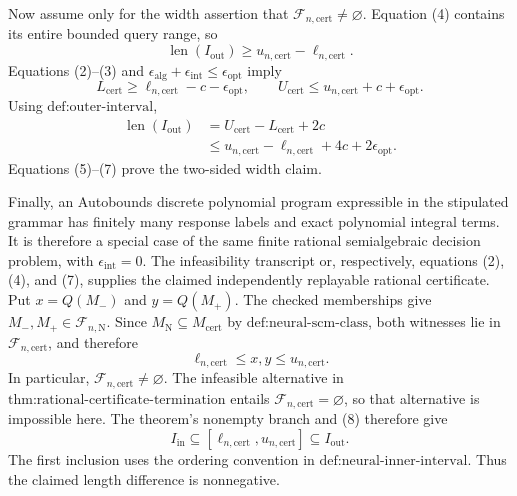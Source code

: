 Now assume only for the width assertion that \(\mathcal F_{n,\mathrm{cert}}\ne\varnothing\).  Equation (4) contains its entire bounded query range, so
\[
\operatorname{len}(I_{\mathrm{out}})\geq
u_{n,\mathrm{cert}}-\ell_{n,\mathrm{cert}}. \tag{5}
\]
Equations (2)--(3) and \(\epsilon_{\mathrm{alg}}+\epsilon_{\mathrm{int}}\leq\epsilon_{\mathrm{opt}}\) imply
\[
L_{\mathrm{cert}}\geq\ell_{n,\mathrm{cert}}-c-\epsilon_{\mathrm{opt}},
\qquad
U_{\mathrm{cert}}\leq u_{n,\mathrm{cert}}+c+\epsilon_{\mathrm{opt}}. \tag{6}
\]
Using \(\text{def:outer-interval}\),
\[
\begin{aligned}
\operatorname{len}(I_{\mathrm{out}})
&=U_{\mathrm{cert}}-L_{\mathrm{cert}}+2c\\
&\leq u_{n,\mathrm{cert}}-\ell_{n,\mathrm{cert}}+4c+2\epsilon_{\mathrm{opt}}.
\end{aligned} \tag{7}
\]
Equations (5)--(7) prove the two-sided width claim.

Finally, an Autobounds discrete polynomial program expressible in the stipulated grammar has finitely many response labels and exact polynomial integral terms.  It is therefore a special case of the same finite rational semialgebraic decision problem, with \(\epsilon_{\mathrm{int}}=0\).  The infeasibility transcript or, respectively, equations (2), (4), and (7), supplies the claimed independently replayable rational certificate.
Put \(x=Q(M_-)\) and \(y=Q(M_+)\).  The checked memberships give \(M_-,M_+\in\mathcal F_{n,\mathrm N}\).  Since \(M_{\mathrm N}\subseteq M_{\mathrm{cert}}\) by \(\text{def:neural-scm-class}\), both witnesses lie in \(\mathcal F_{n,\mathrm{cert}}\), and therefore
\[
\ell_{n,\mathrm{cert}}\leq x,y\leq u_{n,\mathrm{cert}}. \tag{8}
\]
In particular, \(\mathcal F_{n,\mathrm{cert}}\ne\varnothing\).  The infeasible alternative in \(\text{thm:rational-certificate-termination}\) entails \(\mathcal F_{n,\mathrm{cert}}=\varnothing\), so that alternative is impossible here.  The theorem's nonempty branch and (8) therefore give
\[
I_{\mathrm{in}}\subseteq[\ell_{n,\mathrm{cert}},u_{n,\mathrm{cert}}]
\subseteq I_{\mathrm{out}}. \tag{9}
\]
The first inclusion uses the ordering convention in \(\text{def:neural-inner-interval}\).  Thus the claimed length difference is nonnegative.

